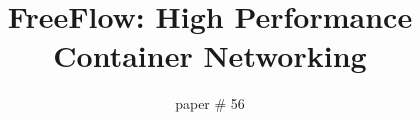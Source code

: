 \documentclass{cls/hotnets16}
\begin{document}
\title{FreeFlow: High Performance Container Networking}

\author{paper \# 56}

\date{}


\maketitle
\thispagestyle{empty}










\small


\end{document}
